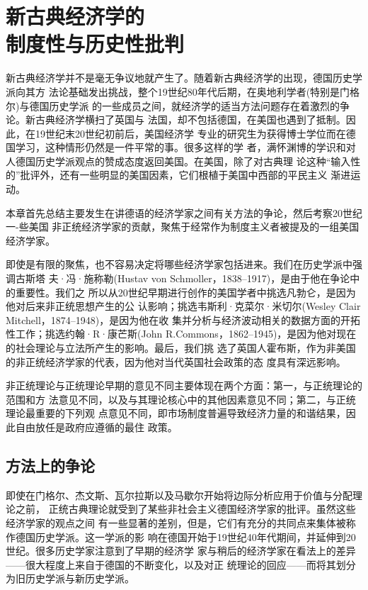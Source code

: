 \chapter{新古典经济学的\\制度性与历史性批判}

新古典经济学并不是毫无争议地就产生了。随着新古典经济学的出现，德国历史学派向其方
法论基础发出挑战，整个19世纪80年代后期，在奥地利学者(特别是门格尔)与德国历史学派
的一些成员之间，就经济学的适当方法问题存在着激烈的争论。新古典经济学横扫了英国与
法国，却不包括德国，在美国也遇到了抵制。因此，在19世纪末20世纪初前后，美国经济学
专业的研究生为获得博士学位而在德国学习，这种情形仍然是一件平常的事。很多这样的学
者，满怀渊博的学识和对人德国历史学派观点的赞成态度返回美国。在美国，除了对古典理
论这种“输入性的”批评外，还有一些明显的美国因素，它们根植于美国中西部的平民主义
渐进运动。

本章首先总结主要发生在讲德语的经济学家之间有关方法的争论，然后考察20世纪一-些美国
非正统经济学家的贡献，聚焦于经常作为制度主义者被提及的一组美国经济学家。

即使是有限的聚焦，也不容易决定将哪些经济学家包括进来。我们在历史学派中强调古斯塔
夫·冯·施称勒(Hustav von Schmoller，1838--1917)，是由于他在争论中的重要性。我们之
所以从20世纪早期进行创作的美国学者中挑选凡勃仑，是因为他对后来非正统思想产生的公
认影响；挑选韦斯利·克菜尔·米切尔(Wesley Clair Mitchell，1874--1948)，是因为他在收
集并分析与经济波动相关的数据方面的开拓性工作；挑选约翰·R·康芒斯(John
R.Commons，1862--1945)，是因为他对现在的社会理论与立法所产生的影响。最后，我们挑
选了英国人霍布斯，作为非美国的非正统经济学家的代表，因为他对当代英国社会政策的态
度具有深远影响。

非正统理论与正统理论早期的意见不同主要体现在两个方面：第一，与正统理论的范围和方
法意见不同，以及与其理论核心中的其他因素意见不同；第二，与正统理论最重要的下列观
点意见不同，即市场制度普遍导致经济力量的和谐结果，因此自由放任是政府应遵循的最住
政策。

\section{方法上的争论}

即使在门格尔、杰文斯、瓦尔拉斯以及马歇尔开始将边际分析应用于价值与分配理论之前，
正统古典理论就受到了某些非社会主义德国经济学家的批评。虽然这些经济学家的观点之间
有一些显著的差别，但是，它们有充分的共同点来集体被称作德国历史学派。这一学派的影
响在德国开始于19世纪40年代期间，并延伸到20世纪。很多历史学家注意到了早期的经济学
家与稍后的经济学家在看法上的差异——很大程度上来自于德国的不断变化，以及对正
统理论的回应——而将其划分为旧历史学派与新历史学派。

